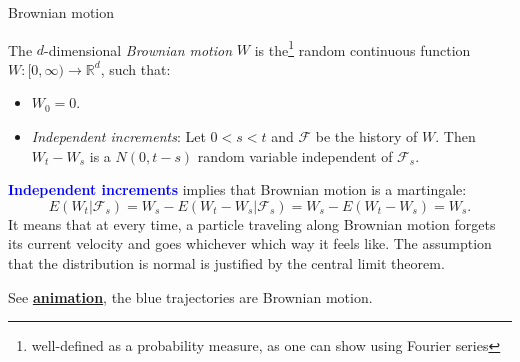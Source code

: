 \documentclass[10pt]{beamer}
\newcommand{\RR}{\mathbb{R}}
\newcommand{\attn}[1]{\textbf{\textcolor{blue}{#1}}}
\begin{document}
\begin{frame}{Brownian motion}
\begin{definition}
The $d$-dimensional \emph{Brownian motion} $W$ is the\footnote{well-defined as a probability measure, as one can show using Fourier series} random continuous function $W: [0, \infty) \to \RR^d$, such that:
\begin{itemize}
\item $W_0 = 0$.
\item \emph{Independent increments}: Let $0 < s < t$ and $\mathcal F$ be the history of $W$. Then $W_t - W_s$ is a $N(0, t - s)$ random variable independent of $\mathcal F_s$.
\end{itemize}
\end{definition}
\attn{Independent increments} implies that Brownian motion is a martingale:
$$E(W_t|\mathcal F_s) = W_s - E(W_t - W_s|\mathcal F_s) = W_s - E(W_t - W_s) = W_s.$$
It means that at every time, a particle traveling along Brownian motion forgets its current velocity and goes whichever which way it feels like.
The assumption that the distribution is normal is justified by the central limit theorem.

See \attn{\href{https://upload.wikimedia.org/wikipedia/commons/5/51/Brownianmotion5particles150frame.gif}{animation}}, the blue trajectories are Brownian motion.

\end{frame}
\end{document}
